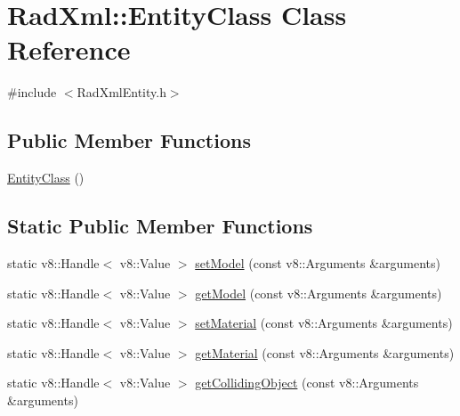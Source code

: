 \hypertarget{class_rad_xml_1_1_entity_class}{\section{Rad\-Xml\-:\-:Entity\-Class Class Reference}
\label{class_rad_xml_1_1_entity_class}
}


{\ttfamily \#include $<$Rad\-Xml\-Entity.\-h$>$}

\subsection*{Public Member Functions}
\begin{DoxyCompactItemize}
\item 
\hyperlink{class_rad_xml_1_1_entity_class_a15ff109d03c80dcdc5d5ab8cffcc7d38}{Entity\-Class} ()
\end{DoxyCompactItemize}
\subsection*{Static Public Member Functions}
\begin{DoxyCompactItemize}
\item 
static v8\-::\-Handle$<$ v8\-::\-Value $>$ \hyperlink{class_rad_xml_1_1_entity_class_a1b433eeb2c12eb97ae862f1b552401ce}{set\-Model} (const v8\-::\-Arguments \&arguments)
\item 
static v8\-::\-Handle$<$ v8\-::\-Value $>$ \hyperlink{class_rad_xml_1_1_entity_class_a76d5d02892eefe6df6ecabfcb2e30266}{get\-Model} (const v8\-::\-Arguments \&arguments)
\item 
static v8\-::\-Handle$<$ v8\-::\-Value $>$ \hyperlink{class_rad_xml_1_1_entity_class_a2231852e7fd48d804691fe8b048b44f6}{set\-Material} (const v8\-::\-Arguments \&arguments)
\item 
static v8\-::\-Handle$<$ v8\-::\-Value $>$ \hyperlink{class_rad_xml_1_1_entity_class_abc12795492058e76eb34b7b1ee2cf5ff}{get\-Material} (const v8\-::\-Arguments \&arguments)
\item 
static v8\-::\-Handle$<$ v8\-::\-Value $>$ \hyperlink{class_rad_xml_1_1_entity_class_a427b0763acd18ba03818e63a6c127bd5}{get\-Colliding\-Object} (const v8\-::\-Arguments \&arguments)
\end{DoxyCompactItemize}


